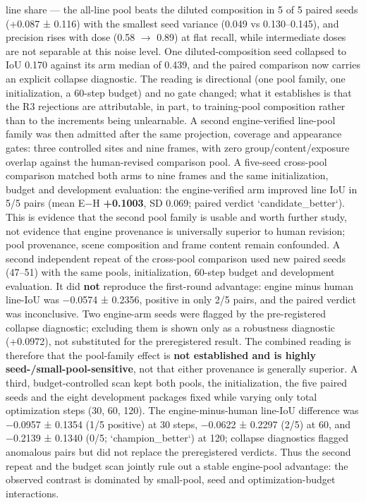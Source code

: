 \documentclass[journal]{IEEEtran}
\begin{document}
line share --- the all-line pool beats the diluted composition in 5 of 5 paired seeds (+0.087 ± 0.116)
with the smallest seed variance (0.049 vs 0.130--0.145), and precision rises with dose (0.58 $\rightarrow$ 0.89)
at flat recall, while intermediate doses are not separable at this noise level. One diluted-composition
seed collapsed to IoU 0.170 against its arm median of 0.439, and the paired comparison now carries
an explicit collapse diagnostic. The reading is directional (one pool family, one initialization, a
60-step budget) and no gate changed; what it establishes is that the R3 rejections are attributable,
in part, to training-pool composition rather than to the increments being unlearnable. A second engine-verified line-pool family was then admitted after the same projection, coverage and appearance gates: three controlled sites and nine frames, with zero group/content/exposure overlap against the human-revised comparison pool. A five-seed cross-pool comparison matched both arms to nine frames and the same initialization, budget and development evaluation: the engine-verified arm improved line IoU in 5/5 pairs (mean E−H \textbf{+0.1003}, SD 0.069; paired verdict `candidate_better`). This is evidence that the second pool family is usable and worth further study, not evidence that engine provenance is universally superior to human revision; pool provenance, scene composition and frame content remain confounded.
A second independent repeat of the cross-pool comparison used new paired seeds (47--51) with the same pools, initialization, 60-step budget and development evaluation. It did \textbf{not} reproduce the first-round advantage: engine minus human line-IoU was −0.0574 ± 0.2356, positive in only 2/5 pairs, and the paired verdict was inconclusive. Two engine-arm seeds were flagged by the pre-registered collapse diagnostic; excluding them is shown only as a robustness diagnostic (+0.0972), not substituted for the preregistered result. The combined reading is therefore that the pool-family effect is \textbf{not established and is highly seed-/small-pool-sensitive}, not that either provenance is generally superior.
A third, budget-controlled scan kept both pools, the initialization, the five paired seeds and the eight development packages fixed while varying only total optimization steps (30, 60, 120). The engine-minus-human line-IoU difference was −0.0957 ± 0.1354 (1/5 positive) at 30 steps, −0.0622 ± 0.2297 (2/5) at 60, and −0.2139 ± 0.1340 (0/5; `champion_better`) at 120; collapse diagnostics flagged anomalous pairs but did not replace the preregistered verdicts. Thus the second repeat and the budget scan jointly rule out a stable engine-pool advantage: the observed contrast is dominated by small-pool, seed and optimization-budget interactions.
\end{document}
